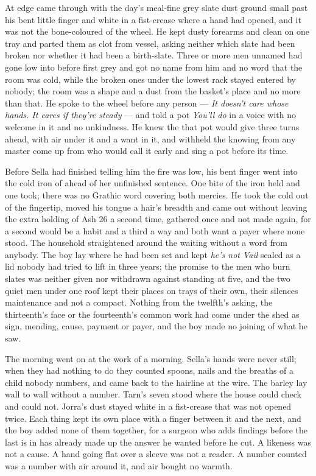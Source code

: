 \scenebreak

At  edge  came through  with the day's meal-fine grey slate dust ground small past his bent little finger and white in a fist-crease where a hand had opened, and it was not the bone-coloured  of the wheel. He kept dusty forearms and clean on one tray and parted them as clot from vessel, asking neither which slate had been broken nor whether it had been a birth-slate. Three or more men unnamed had gone low into  before first grey and got no name from him and no word that the room was cold, while the broken ones under the lowest rack stayed entered by nobody; the room was a shape and a dust from the basket's place and no more than that. He spoke to the wheel before any person --- \emph{It doesn't care whose hands. It cares if they're steady} --- and told a pot \emph{You'll do} in a voice with no welcome in it and no unkindness. He knew the  that pot would give three turns ahead, with air under it and a want in it, and withheld the knowing from any master come up from  who would call it early and sing a pot before its time.

Before Sella had finished telling him the fire was low, his bent finger went into the cold iron of  ahead of her unfinished sentence. One bite of the iron held and one took; there was no Grathic word covering both mercies. He took the cold out of the fingertip, moved his tongue a hair's breadth and came out without leaving the extra holding of Ash 26 a second time, gathered once and not made again, for a second would be a habit and a third a way and both want a payer where none stood. The household straightened around the waiting without a word from anybody. The boy lay where he had been set and kept \emph{he's not Vail} sealed as a lid nobody had tried to lift in three years; the promise to the men who burn slates was neither given nor withdrawn against  standing at five, and the two quiet men under one roof kept their places on trays of their own, their silences maintenance and not a compact. Nothing from the twelfth's asking, the thirteenth's face or the fourteenth's common work had come under the shed as sign, mending, cause, payment or payer, and the boy made no joining of what he saw.

\scenebreak

The morning went on at the work of a morning. Sella's hands were never still; when they had nothing to do they counted spoons, nails and the breaths of a child nobody numbers, and came back to the hairline at the wire. The barley lay wall to wall without a number. Tarn's seven stood where the house could check and could not. Jorra's dust stayed white in a fist-crease that was not opened twice. Each thing kept its own place with a finger between it and the next, and the boy added none of them together, for a surgeon who adds findings before the last is in has already made up the answer he wanted before he cut. A likeness was not a cause. A hand going flat over a sleeve was not a reader. A number counted was a number with air around it, and air bought no warmth.

